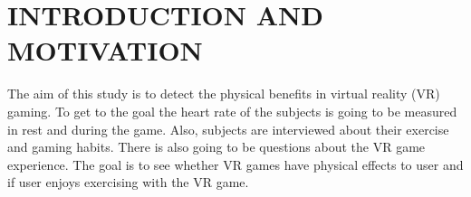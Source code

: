 \documentclass{sig-alternate-05-2015}
\begin{document}



%
%



%
%

%
%
\printccsdesc



\section{INTRODUCTION AND MOTIVATION}
The aim of this study is to detect the physical benefits in virtual reality 
(VR) gaming. To get to the goal the heart rate of the subjects is going to 
be measured in rest and during the game. Also, subjects are interviewed about 
their exercise and gaming habits. There is also going to be questions about 
the VR game experience. The goal is to see whether VR games have physical 
effects to user and if user enjoys exercising with the VR game.
\end{document}
